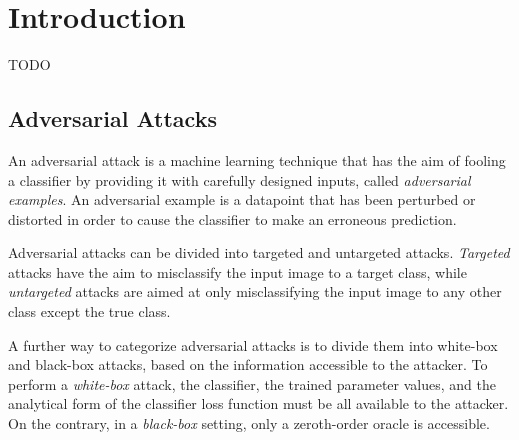 \section{Introduction}
TODO
\subsection{Adversarial Attacks}
An adversarial attack is a machine learning technique that has the aim of fooling a classifier by providing it with
carefully designed inputs, called \textit{adversarial examples}. An adversarial example is a datapoint that has
been perturbed or distorted in order to cause the classifier to make an erroneous prediction.

Adversarial attacks can be divided into targeted and untargeted attacks. \textit{Targeted} attacks have the aim to
misclassify the input image to a target class, while \textit{untargeted} attacks are aimed at only misclassifying
the input image to any other class except the true class.

A further way to categorize adversarial attacks is to divide them into white-box and black-box attacks, based on
the information accessible to the attacker. To perform a \textit{white-box} attack, the classifier, the trained
parameter values, and the analytical form of the classifier loss function must be all available to the attacker. On
the contrary, in a \textit{black-box} setting, only a zeroth-order oracle is accessible.




